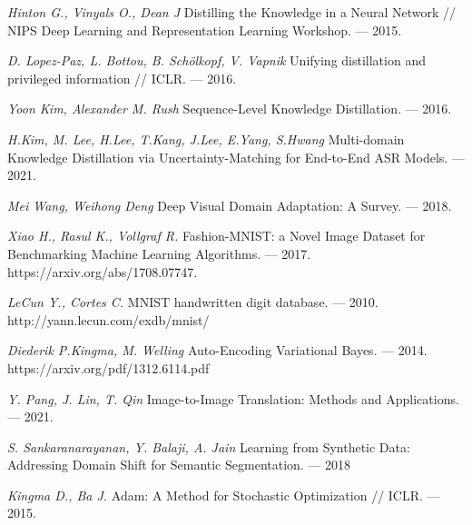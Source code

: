\newpage


\begin{thebibliography}{99}
	\textit{Hinton G., Vinyals O., Dean J} Distilling the Knowledge in a Neural Network // NIPS Deep Learning and Representation Learning Workshop. — 2015.
    
    \textit{D. Lopez-Paz, L. Bottou, B. Schölkopf, V. Vapnik} Unifying distillation and privileged information // ICLR. — 2016.
	
	\textit{Yoon Kim, Alexander M. Rush} Sequence-Level Knowledge Distillation. — 2016.
	
	\textit{H.Kim, M. Lee, H.Lee, T.Kang, J.Lee, E.Yang, S.Hwang} Multi-domain Knowledge Distillation via Uncertainty-Matching for End-to-End ASR Models. — 2021.
	
	\textit{Mei Wang, Weihong Deng} Deep Visual Domain Adaptation: A Survey. — 2018.
	
    \textit{Xiao H., Rasul K., Vollgraf R.} Fashion-MNIST: a Novel Image Dataset for
    Benchmarking Machine Learning Algorithms. — 2017. https://arxiv.org/abs/1708.07747.
    
    \textit{LeCun Y., Cortes C.} MNIST handwritten digit database. --- 2010. http://yann.lecun.com/exdb/mnist/
    
    \textit{Diederik P.Kingma, M. Welling} Auto-Encoding Variational Bayes. --- 2014. https://arxiv.org/pdf/1312.6114.pdf
    
    \textit{Y. Pang, J. Lin, T. Qin} Image-to-Image Translation: Methods and 
    Applications. --- 2021.
    
    \textit{S. Sankaranarayanan, Y. Balaji, A. Jain} Learning from Synthetic Data: Addressing Domain Shift for Semantic Segmentation. --- 2018
    
    \textit{Kingma D., Ba J.} Adam: A Method for Stochastic Optimization // ICLR. — 2015.
	
\end{thebibliography}
